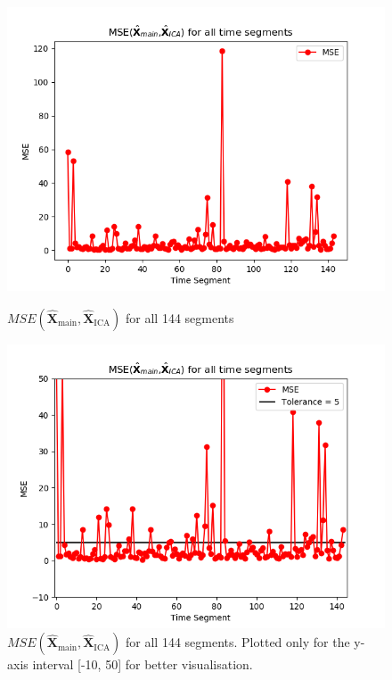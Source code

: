 \begin{figure}[H]
\begin{widepage}
    \begin{minipage}[t]{.45\textwidth}
		\centering
		\includegraphics[width=1\linewidth]{figures/ch_7/resultat/average_mse_third_removed_ica}
	\caption{$MSE\left(\hat{\mathbf{X}}_{\text{main}},\hat{\mathbf{X}}_{\text{ICA}}\right)$ for all 144 segments}
	\label{fig:M<N_1}
    \end{minipage} 
\hspace{0.5cm}
    \begin{minipage}[t]{.45\textwidth}
        \centering
		\includegraphics[width=1\linewidth]{figures/ch_7/resultat/average_mse_third_removed_ica_zoom.png}
	\caption{$MSE\left(\hat{\mathbf{X}}_{\text{main}},\hat{\mathbf{X}}_{\text{ICA}}\right)$ for all 144 segments. Plotted only for the y-axis interval [-10, 50] for better visualisation.}
	\label{fig:M<N_1_2}
    \end{minipage}
\end{widepage}
\end{figure}
